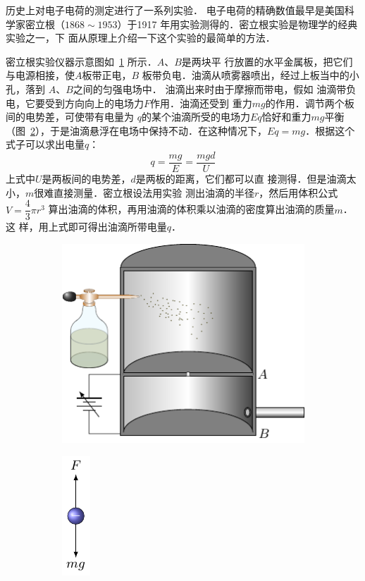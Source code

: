 历史上对电子电荷的测定进行了一系列实验．
电子电荷的精确数值最早是美国科学家密立根（$1868 \sim 1953$）于1917
年用实验测得的．密立根实验是物理学的经典实验之一，下
面从原理上介绍一下这个实验的最简单的方法．


密立根实验仪器示意图如~\ref{fig_B_6-31a} 所示．$A$、$B$是两块平
行放置的水平金属板，把它们与电源相接，使$A$板带正电，$B$
板带负电．油滴从喷雾器喷出，经过上板当中的小孔，落到
$A$、$B$之间的匀强电场中．
油滴出来时由于摩擦而带电，假如
油滴带负电，它要受到方向向上的电场力$F$作用．油滴还受到
重力$mg$的作用．调节两个板间的电势差，可使带有电量为
$q$的某个油滴所受的电场力$Eq$恰好和重力$mg$平衡（图~\ref{fig_B_6-31b}），于是油滴悬浮在电场中保持不动．在这种情况下，$Eq=
mg$．根据这个式子可以求出电量$q$：
\[q=\frac{mg}{E}=\frac{mgd}{U}  \]
上式中$U$是两板间的电势差，$d$是两板的距离，它们都可以直
接测得．但是油滴太小，$m$很难直接测量．密立根设法用实验
测出油滴的半径$r$，然后用体积公式$V=\dfrac{4}{3}\pi r^3$
算出油滴的体积，再用油滴的体积乘以油滴的密度算出油滴的质量$m$．这
样，用上式即可得出油滴所带电量$q$．

\begin{figure}[htbp]
	\centering
	\begin{subfigure}{0.6\linewidth}
		\centering
		\includegraphics{fig/B/6-31a.pdf}
		\caption{}\label{fig_B_6-31a}
	\end{subfigure}
	\hfil
	\begin{subfigure}{0.3\linewidth}
		\centering
		\includegraphics{fig/B/6-31b.pdf}
		\caption{}\label{fig_B_6-31b}
	\end{subfigure}
	\caption{}\label{fig_B_6-31}
\end{figure}



